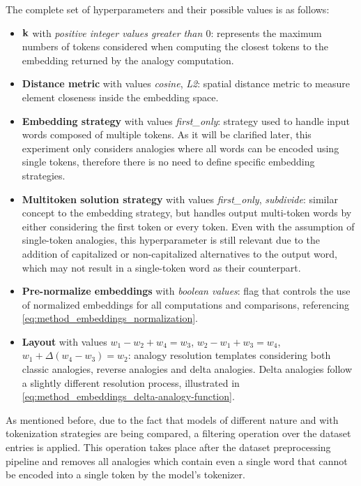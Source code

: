 The complete set of hyperparameters and their possible values is as follows:
\begin{itemize}
    \item $\bm{\mathbf{k}}$ with \textit{positive integer values greater than $0$}: represents the maximum numbers of tokens considered when computing the closest tokens to the embedding returned by the analogy computation.
    \item \textbf{Distance metric} with values \textit{cosine}, \textit{L2}: spatial distance metric to measure element closeness inside the embedding space.
    \item \textbf{Embedding strategy} with values \textit{first\_only}: strategy used to handle input words composed of multiple tokens.
As it will be clarified later, this experiment only considers analogies where all words can be encoded using single tokens, therefore there is no need to define specific embedding strategies.
    \item \textbf{Multitoken solution strategy} with values \textit{first\_only}, \textit{subdivide}: similar concept to the embedding strategy, but handles output multi-token words by either considering the first token or every token.
Even with the assumption of single-token analogies, this hyperparameter is still relevant due to the addition of capitalized or non-capitalized alternatives to the output word, which may not result in a single-token word as their counterpart.
    \item \textbf{Pre-normalize embeddings} with \textit{boolean values}: flag that controls the use of normalized embeddings for all computations and comparisons, referencing \cref{eq:method_embeddings_normalization}.
    \item \textbf{Layout} with values $w_1 - w_2 + w_4 = w_3$, $w_2 - w_1 + w_3 = w_4$, $w_1 + \Delta(w_4 - w_3) = w_2$: analogy resolution templates considering both classic analogies, reverse analogies and delta analogies.
Delta analogies follow a slightly different resolution process, illustrated in \cref{eq:method_embeddings_delta-analogy-function}.
\end{itemize}

As mentioned before, due to the fact that models of different nature and with  tokenization strategies are being compared, a filtering operation over the dataset entries is applied.
This operation takes place after the dataset preprocessing pipeline and removes all analogies which contain even a single word that cannot be encoded into a single token by the model's tokenizer.

